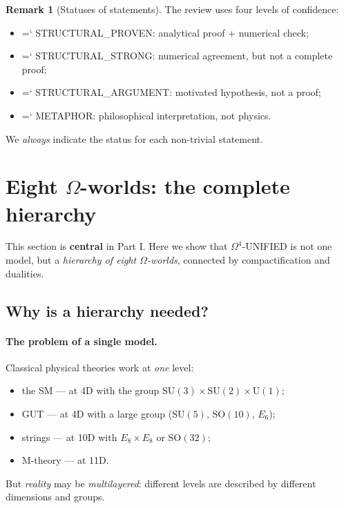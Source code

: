 \documentclass[11pt,a4paper]{article}
\newcommand{\SU}{\mathrm{SU}}
\newcommand{\SO}{\mathrm{SO}}
\newcommand{\Om}{\Omega^4}
\renewcommand{\texttt}[1]{{\ttfamily\hyphenchar\font=`\- #1}}
\theoremstyle{definition}
\newtheorem{remark}[theorem]{Remark}
\begin{document}
\begin{remark}[Statuses of statements]
\label{rem:statuses}
The review uses four levels of confidence:
\begin{itemize}
    \item \texttt{STRUCTURAL\_PROVEN}: analytical 
          proof + numerical check;
    \item \texttt{STRUCTURAL\_STRONG}: numerical agreement, 
          but not a complete proof;
    \item \texttt{STRUCTURAL\_ARGUMENT}: motivated 
          hypothesis, not a proof;
    \item \texttt{METAPHOR}: philosophical interpretation, 
          not physics.
\end{itemize}
We \emph{always} indicate the status for each non-trivial 
statement.
\end{remark}

\section{Eight \texorpdfstring{$\Omega$}{Omega}-worlds: the complete hierarchy}
\label{sec:worlds}

This section is \textbf{central} in Part I. Here we 
show that $\Om$-UNIFIED is not one model, but 
a \emph{hierarchy of eight $\Omega$-worlds}, connected 
by compactification and dualities.

\subsection{Why is a hierarchy needed?}
\label{subsec:why-hierarchy}

\paragraph{The problem of a single model.}
Classical physical theories work at \emph{one} level:
\begin{itemize}
    \item the SM — at 4D with the group $\SU(3) \times \SU(2) \times \mathrm{U}(1)$;
    \item GUT — at 4D with a large group ($\SU(5)$, $\SO(10)$, $E_6$);
    \item strings — at 10D with $E_8 \times E_8$ or $\SO(32)$;
    \item M-theory — at 11D.
\end{itemize}
But \emph{reality} may be \emph{multilayered}: different 
levels are described by different dimensions and groups.
\end{document}

